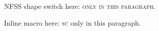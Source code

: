 NFSS shape switch here: \scshape only in this paragraph.

Inline macro here: \textsc{sc} only in this paragraph.

